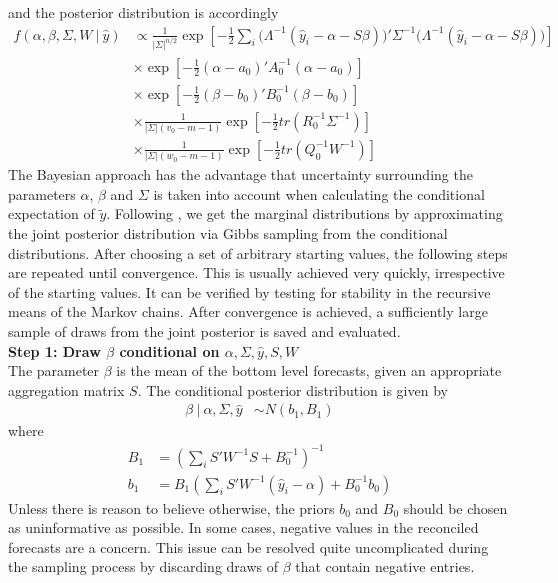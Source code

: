 \documentclass[a4paper,fleqn,11pt]{article}
\begin{document}
and the posterior distribution is accordingly
\begin{align*}
f(\alpha,\beta,\Sigma,W\ |\ \hat{y}) & \propto \frac{1}{|\Sigma|^{n/2}}\exp\left[-\frac{1}{2} \sum_i \big(\Lambda^{-1}(\hat{y}_i - \alpha - S\beta)\big)'\Sigma^{-1}\big(\Lambda^{-1}(\hat{y}_i - \alpha - S\beta)\big)\right] \\
&\times \exp \left[-\frac{1}{2}(\alpha - a_0)'A_0^{-1}(\alpha - a_0)\right] \\
&\times \exp \left[-\frac{1}{2}(\beta - b_0)'B_0^{-1}(\beta - b_0)\right] \\
&\times \frac{1}{|\Sigma|(v_0 - m - 1)} \exp \left[-\frac{1}{2} tr(R_0^{-1}\Sigma^{-1}) \right]\\
&\times \frac{1}{|\Sigma|(w_0 - m - 1)} \exp \left[-\frac{1}{2} tr(Q_0^{-1}W^{-1}) \right]
\end{align*}
The Bayesian approach has the advantage that uncertainty surrounding the parameters $\alpha$, $\beta$ and $\Sigma$ is taken into account when calculating the conditional expectation of $\tilde{y}$. Following \cite{Percy1992}, we get the marginal distributions by approximating the joint posterior distribution via Gibbs sampling from the conditional distributions. After choosing a set of arbitrary starting values, the following steps are repeated until convergence. This is usually achieved very quickly, irrespective of the starting values. It can be verified by testing for stability in the recursive means of the Markov chains. After convergence is achieved, a sufficiently large sample of draws from the joint posterior is saved and evaluated. \\


\noindent\textbf{Step 1: Draw $\beta$ conditional on $\alpha,\Sigma,\hat{y},S,W$}\\
The parameter $\beta$ is the mean of the bottom level forecasts, given an appropriate aggregation matrix $S$. The conditional posterior distribution is given by
\begin{align}
\beta\ |\ \alpha,\Sigma,\hat{y} &\sim N(b_1,B_1)
\end{align}
where
\begin{align*}
B_1 &= \left(\sum_i S'W^{-1}S + B_0^{-1}\right)^{-1} \\
b_1 &= B_1 \left(\sum_i S'W^{-1} (\hat{y}_i - \alpha) + B_0^{-1}b_0\right)
\end{align*}
Unless there is reason to believe otherwise, the priors $b_0$ and $B_0$ should be chosen as uninformative as possible. In some cases, negative values in the reconciled forecasts are a concern. This issue can be resolved quite uncomplicated during the sampling process by discarding draws of $\beta$ that contain negative entries.\\
\end{document}

